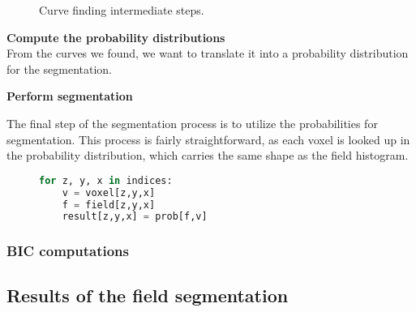 \begin{figure}
    \caption{Curve finding intermediate steps.}
    \label{fig:curves}
\end{figure}

\vspace{\baselineskip}
\noindent\textbf{Compute the probability distributions} \\

From the curves we found, we want to translate it into a probability distribution for the segmentation.

\vspace{\baselineskip}
\noindent\textbf{Perform segmentation}

The final step of the segmentation process is to utilize the probabilities for segmentation.
This process is fairly straightforward, as each voxel is looked up in the probability distribution, which carries the same shape as the field histogram.

\begin{figure}
    \begin{lstlisting}[language=Python,caption=Python-like pseudo code for the final segmentation.,label=lis:segmentation]
for z, y, x in indices:
    v = voxel[z,y,x]
    f = field[z,y,x]
    result[z,y,x] = prob[f,v]
    \end{lstlisting}
\end{figure}

\subsubsection{BIC computations}


\subsection{Results of the field segmentation}

